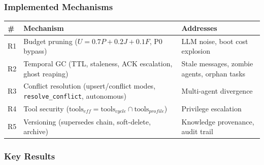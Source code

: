 \documentclass[11pt]{article}
\begin{document}
\subsubsection{Implemented Mechanisms}\label{implemented-mechanisms}

\begin{longtable}[]{@{}
  >{\raggedright\arraybackslash}p{}
  >{\raggedright\arraybackslash}p{}
  >{\raggedright\arraybackslash}p{}@{}}
\toprule\noalign{}
\begin{minipage}[b]{\linewidth}\raggedright
\#
\end{minipage} & \begin{minipage}[b]{\linewidth}\raggedright
Mechanism
\end{minipage} & \begin{minipage}[b]{\linewidth}\raggedright
Addresses
\end{minipage} \\
\midrule\noalign{}
\endhead
\bottomrule\noalign{}
\endlastfoot
R1 & Budget pruning (\(U = 0.7P + 0.2J + 0.1F\), P0 bypass) & LLM noise,
boot cost explosion \\
R2 & Temporal GC (TTL, staleness, ACK escalation, ghost reaping) & Stale
messages, zombie agents, orphan tasks \\
R3 & Conflict resolution (upsert/conflict modes,
\texttt{resolve\_conflict}, autonomous) & Multi-agent divergence \\
R4 & Tool security
(\(\text{tools}_{eff} = \text{tools}_{cycle} \cap \text{tools}_{profile}\))
& Privilege escalation \\
R5 & Versioning (supersedes chain, soft-delete, archive) & Knowledge
provenance, audit trail \\
\end{longtable}

\subsubsection{Key Results}\label{key-results}
\end{document}
